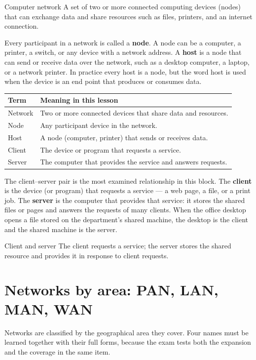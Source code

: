 \begin{definitionbox}{Computer network}
A set of two or more connected computing devices (nodes) that can exchange
data and share resources such as files, printers, and an internet
connection.
\end{definitionbox}

Every participant in a network is called a \textbf{node}. A node can be a
computer, a printer, a switch, or any device with a network address. A
\textbf{host} is a node that can send or receive data over the network, such
as a desktop computer, a laptop, or a network printer. In practice every host
is a node, but the word host is used when the device is an end point that
produces or consumes data.

\begin{center}
\begin{tabular}{p{}p{}}
\toprule
\textbf{Term} & \textbf{Meaning in this lesson} \\
\midrule
Network & Two or more connected devices that share data and resources. \\
Node & Any participant device in the network. \\
Host & A node (computer, printer) that sends or receives data. \\
Client & The device or program that requests a service. \\
Server & The computer that provides the service and answers requests. \\
\bottomrule
\end{tabular}
\end{center}

The client--server pair is the most examined relationship in this block. The
\textbf{client} is the device (or program) that requests a service --- a web
page, a file, or a print job. The \textbf{server} is the computer that
provides that service: it stores the shared files or pages and answers the
requests of many clients. When the office desktop opens a file stored on the
department's shared machine, the desktop is the client and the shared machine
is the server.

\begin{definitionbox}{Client and server}
The client requests a service; the server stores the shared resource and
provides it in response to client requests.
\end{definitionbox}

\section{Networks by area: PAN, LAN, MAN, WAN}
Networks are classified by the geographical area they cover. Four names must
be learned together with their full forms, because the exam tests both the
expansion and the coverage in the same item.


